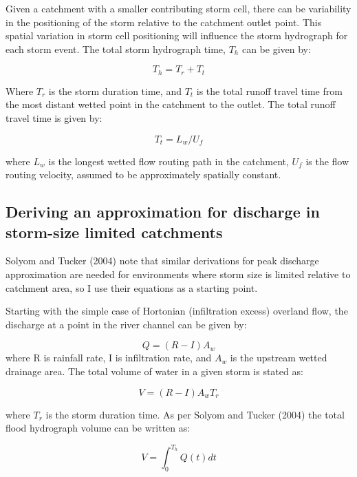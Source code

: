 \documentclass[12pt,oneside,PhD]{muthesis}
\begin{document}
Given a catchment with a smaller contributing storm cell, there can be variability in the positioning of the storm relative to the catchment outlet point. This spatial variation in storm cell positioning will influence the storm hydrograph for each storm event. The total storm hydrograph time, \(T_h\) can be given by:

\begin{equation}
T_h = T_r + T_t
\end{equation}

Where \(T_r\) is the storm duration time, and \(T_t\) is the total runoff travel time from the most distant wetted point in the catchment to the outlet. The total runoff travel time is given by:

\begin{equation}
T_t = L_w/U_f
\end{equation}

where \( L_w \) is the longest wetted flow routing path in the catchment, \(U_f\) is the flow routing velocity, assumed to be approximately spatially constant. 

\subsection{Deriving an approximation for discharge in storm-size limited catchments} 
Solyom and Tucker (2004) note that similar derivations for peak discharge approximation are needed for environments where storm size is limited relative to catchment area, so I use their equations as a starting point. 

Starting with the simple case of Hortonian (infiltration excess) overland flow, the discharge at a point in the river channel can be given by:

\begin{equation}
Q = (R - I)A_w
\end{equation}
where R is rainfall rate, I is infiltration rate, and \(A_w\) is the upstream wetted drainage area. The total volume of water in a given storm is stated as:

\begin{equation}
V = (R - I)A_w T_r
\end{equation}

where \(T_r\) is the storm duration time. As per Solyom and Tucker (2004) the total flood hydrograph volume can be written as:

\begin{equation}
V = \int_{0}^{T_h} Q(t) dt
\end{equation}
\end{document}
